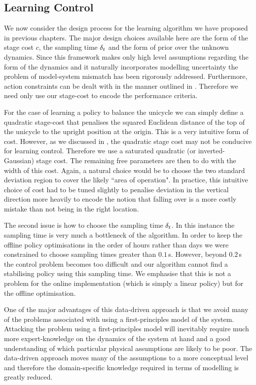 \subsection{Learning Control}
We now consider the design process for the learning algorithm we have proposed in previous chapters.  The major design choices available here are the form of the stage cost $c$, the sampling time $\delta_t$ and the form of prior over the unknown dynamics. Since this framework makes only high level assumptions regarding the form of the dynamics and it naturally incorporates modelling uncertainty the problem of model-system mismatch has been rigorously addressed. Furthermore, action constraints can be dealt with in the manner outlined in . Therefore we need only use our stage-cost to encode the performance criteria.

For the case of learning a policy to balance the unicycle we can simply define a quadratic stage-cost that penalises the squared Euclidean distance of the top of the unicycle to the upright position at the origin. This is a very intuitive form of cost. However, as we discussed in , the quadratic stage cost may not be conducive for learning control. Therefore we use a saturated quadratic (or inverted-Gaussian) stage cost. The remaining free parameters are then to do with the width of this cost. Again, a natural choice would be to choose the two standard deviation region to cover the likely ``area of operation".  In practice, this intuitive choice of cost had to be tuned slightly to penalise deviation in the vertical direction more heavily to encode the notion that falling over is a more costly mistake than not being in the right location.


The second issue is how to choose the sampling time $\delta_t$. In this instance the sampling time is very much a bottleneck of the algorithm. In order to keep the offline policy optimisations in the order of hours rather than days we were constrained to choose sampling times greater than $0.1\,$s. However, beyond $0.2\,$s the control problem becomes too difficult and our algorithm cannot find a stabilising policy using this sampling time. We emphasise that this is not a problem for the online implementation (which is simply a linear policy) but for the offline optimisation.


One of the major advantages of this data-driven approach is that we avoid many of the problems associated with using a first-principles model of the system. Attacking the problem using a first-principles model will inevitably require much more expert-knowledge on the dynamics of the system at hand and a good understanding of which particular physical assumptions are likely to be poor. The data-driven approach moves many of the assumptions to a more conceptual level and therefore the domain-specific knowledge required in terms of modelling is greatly reduced.



